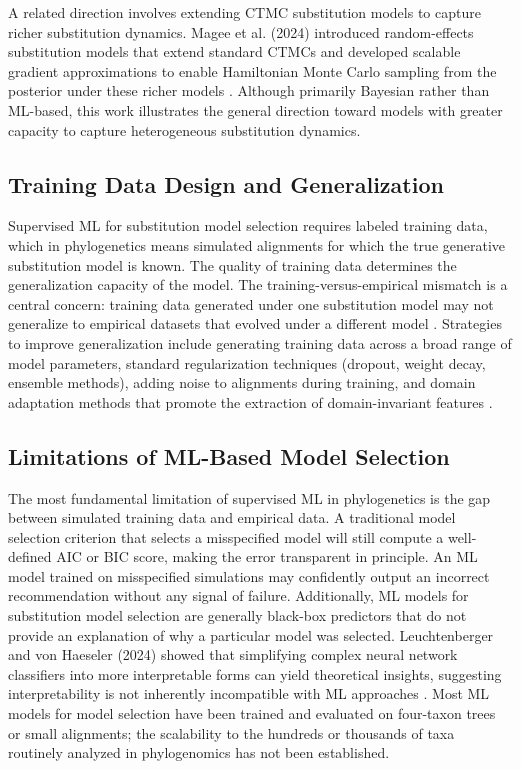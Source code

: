 A related direction involves extending CTMC substitution models to capture richer substitution dynamics. Magee et al. (2024) introduced random-effects substitution models that extend standard CTMCs and developed scalable gradient approximations to enable Hamiltonian Monte Carlo sampling from the posterior under these richer models \parencite{magee2024}. Although primarily Bayesian rather than ML-based, this work illustrates the general direction toward models with greater capacity to capture heterogeneous substitution dynamics.

\subsection{Training Data Design and Generalization}

Supervised ML for substitution model selection requires labeled training data, which in phylogenetics means simulated alignments for which the true generative substitution model is known. The quality of training data determines the generalization capacity of the model. The training-versus-empirical mismatch is a central concern: training data generated under one substitution model may not generalize to empirical datasets that evolved under a different model \parencite{mo2024}. Strategies to improve generalization include generating training data across a broad range of model parameters, standard regularization techniques (dropout, weight decay, ensemble methods), adding noise to alignments during training, and domain adaptation methods that promote the extraction of domain-invariant features \parencite{mosiepel2024}.

\subsection{Limitations of ML-Based Model Selection}

The most fundamental limitation of supervised ML in phylogenetics is the gap between simulated training data and empirical data. A traditional model selection criterion that selects a misspecified model will still compute a well-defined AIC or BIC score, making the error transparent in principle. An ML model trained on misspecified simulations may confidently output an incorrect recommendation without any signal of failure. Additionally, ML models for substitution model selection are generally black-box predictors that do not provide an explanation of why a particular model was selected. Leuchtenberger and von Haeseler (2024) showed that simplifying complex neural network classifiers into more interpretable forms can yield theoretical insights, suggesting interpretability is not inherently incompatible with ML approaches \parencite{leuchtenberger2024}. Most ML models for model selection have been trained and evaluated on four-taxon trees or small alignments; the scalability to the hundreds or thousands of taxa routinely analyzed in phylogenomics has not been established.

